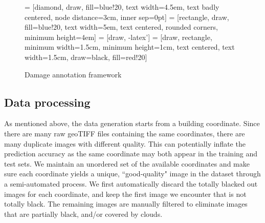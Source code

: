 \documentclass[journal, 12pt, onecolumn,draftclsnofoot]{IEEEtran}
\begin{document}
\begin{figure}
\begin{center}
 = [diamond, draw, fill=blue!20, 
    text width=4.5em, text badly centered, node distance=3cm, inner sep=0pt]
 = [rectangle, draw, fill=blue!20, 
    text width=5em, text centered, rounded corners, minimum height=4em]
 = [draw, -latex']
 = [draw, rectangle, minimum width=1.5cm, minimum height=1cm, text centered, text width=1.5cm, draw=black, fill=red!20]
    



\end{center}

\caption{Damage annotation framework} \label{fig:framework}

\end{figure}

\subsection{Data processing}\label{sec:collection}
As mentioned above, the data generation starts from a building coordinate. Since there are many raw geoTIFF files containing the same coordinates, there are many duplicate images with different quality. This can potentially inflate the prediction accuracy as the same coordinate may both appear in the training and test sets. We maintain an unordered set of the available coordinates and make sure each coordinate yields a unique, ``good-quality" image in the dataset through a semi-automated process. We first automatically discard the totally blacked out images for each coordinate, and keep the first image we encounter that is not totally black. The remaining images are manually filtered to eliminate images that are partially black, and/or covered by clouds. 
\end{document}
